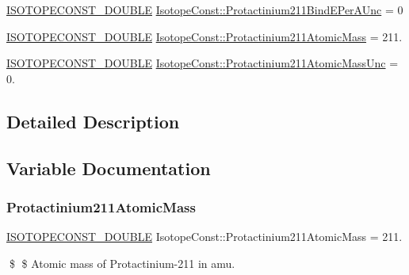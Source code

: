 \begin{DoxyCompactItemize}
\item 
\mbox{\hyperlink{group___isotope_const-_macros_ga8f45a7272ce02c0b4c65c44636ed719a}{I\+S\+O\+T\+O\+P\+E\+C\+O\+N\+S\+T\+\_\+\+D\+O\+U\+B\+LE}} \mbox{\hyperlink{group___isotope_const-_protactinium-_pa211_ga43f8fb537ed0bd1665e44c69806d2bc9}{Isotope\+Const\+::\+Protactinium211\+Bind\+E\+Per\+A\+Unc}} = 0
\item 
\mbox{\hyperlink{group___isotope_const-_macros_ga8f45a7272ce02c0b4c65c44636ed719a}{I\+S\+O\+T\+O\+P\+E\+C\+O\+N\+S\+T\+\_\+\+D\+O\+U\+B\+LE}} \mbox{\hyperlink{group___isotope_const-_protactinium-_pa211_gaf48c773f99768388c36b992e17b59e68}{Isotope\+Const\+::\+Protactinium211\+Atomic\+Mass}} = 211.
\item 
\mbox{\hyperlink{group___isotope_const-_macros_ga8f45a7272ce02c0b4c65c44636ed719a}{I\+S\+O\+T\+O\+P\+E\+C\+O\+N\+S\+T\+\_\+\+D\+O\+U\+B\+LE}} \mbox{\hyperlink{group___isotope_const-_protactinium-_pa211_ga4b669790cdee030b464fa83884ee59b4}{Isotope\+Const\+::\+Protactinium211\+Atomic\+Mass\+Unc}} = 0.
\end{DoxyCompactItemize}


\subsection{Detailed Description}


\subsection{Variable Documentation}
\mbox{\label{group___isotope_const-_protactinium-_pa211_gaf48c773f99768388c36b992e17b59e68}} 
\subsubsection{\texorpdfstring{Protactinium211\+Atomic\+Mass}{Protactinium211AtomicMass}}
{\footnotesize\ttfamily \mbox{\hyperlink{group___isotope_const-_macros_ga8f45a7272ce02c0b4c65c44636ed719a}{I\+S\+O\+T\+O\+P\+E\+C\+O\+N\+S\+T\+\_\+\+D\+O\+U\+B\+LE}} Isotope\+Const\+::\+Protactinium211\+Atomic\+Mass = 211.}

\$ \$ Atomic mass of Protactinium-\/211 in amu. \mbox{\label{group___isotope_const-_protactinium-_pa211_ga4b669790cdee030b464fa83884ee59b4}} 
